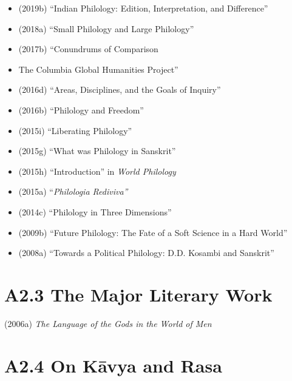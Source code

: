 \begin{itemize}
\item (2019b) “Indian Philology: Edition, Interpretation, and Difference”

 \item (2018a) “Small Philology and Large Philology”

 \item (2017b) “Conundrums of Comparison

 \item The Columbia Global Humanities Project”

 \item (2016d) “Areas, Disciplines, and the Goals of Inquiry”

 \item (2016b) “Philology and Freedom”

 \item (2015i) “Liberating Philology”

 \item (2015g) “What was Philology in Sanskrit”

 \item (2015h) “Introduction” in \textit{World Philology}

 \item (2015a) “\textit{Philologia Rediviva”}

 \item (2014c) “Philology in Three Dimensions”

 \item (2009b) “Future Philology: The Fate of a Soft Science in a Hard World”

 \item (2008a) “Towards a Political Philology: D.D. Kosambi and Sanskrit”

\end{itemize}


\section*{A2.3 The Major Literary Work}

(2006a) \textit{The Language of the Gods in the World of Men}


\section*{A2.4 On Kāvya and Rasa}

